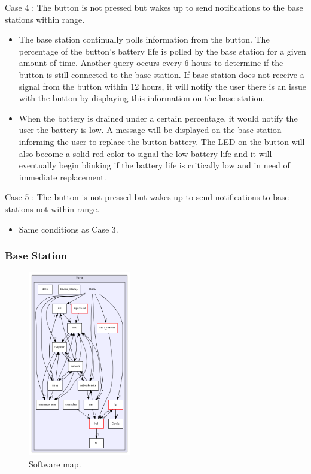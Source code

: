 \documentclass[journal,compsoc]{IEEEtran}
\begin{document}
\begin{LaTeXdescription}
\begin{itemize}
  \end{itemize}
\item[Case 4]:  The button is not pressed but wakes up to send notifications to the base stations within range.
  \begin{itemize}
    \item The base station continually polls information from the button.  The percentage of the button’s battery life is polled by the base station for a given amount of time.  Another query occurs every 6 hours to determine if the button is still connected to the base station.  If base station does not receive a signal from the button within 12 hours, it will notify the user there is an issue with the button by displaying this information on the base station.
    \item When the battery is drained under a certain percentage, it would notify the user the battery is low.  A message will be displayed on the base station informing the user to replace the button battery.  The LED on the button will also become a solid red color to signal the low battery life and it will eventually begin blinking if the battery life is critically low and in need of immediate replacement.
  \end{itemize}
\item[Case 5]: The button is not pressed but wakes up to send notifications to base stations not within range.
  \begin{itemize}
    \item Same conditions as Case 3.
  \end{itemize}
\end{LaTeXdescription}

\subsubsection{Base Station}

\begin{figure}[ht] 	%
\centering
\includegraphics[width=0.4\textwidth]{hahamap.png}
\caption{ \space Software map.}
\label{HaHa Application}
\end{figure}
\end{document}
